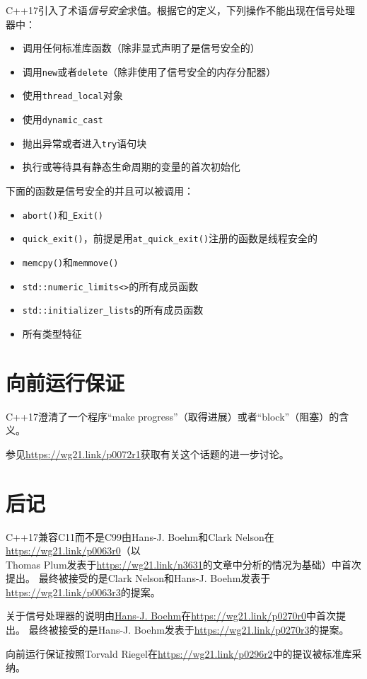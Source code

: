 C++17引入了术语\emph{信号安全}求值。根据它的定义，下列操作不能出现在信号处理器中：
\begin{itemize}
    \item 调用任何标准库函数（除非显式声明了是信号安全的）
    \item 调用\texttt{new}或者\texttt{delete}（除非使用了信号安全的内存分配器）
    \item 使用\texttt{thread\_local}对象
    \item 使用\texttt{dynamic\_cast}
    \item 抛出异常或者进入\texttt{try}语句块
    \item 执行或等待具有静态生命周期的变量的首次初始化
\end{itemize}
下面的函数是信号安全的并且可以被调用：
\begin{itemize}
    \item \texttt{abort()}和\texttt{\_Exit()}
    \item \texttt{quick\_exit()}，前提是用\texttt{at\_quick\_exit()}注册的函数是线程安全的
    \item \texttt{memcpy()}和\texttt{memmove()}
    \item \texttt{std::numeric\_limits<>}的所有成员函数
    \item \texttt{std::initializer\_lists}的所有成员函数
    \item 所有类型特征
\end{itemize}


\section{向前运行保证}
C++17澄清了一个程序“make progress”（取得进展）或者“block”（阻塞）的含义。

参见\url{https://wg21.link/p0072r1}获取有关这个话题的进一步讨论。


\section{后记}
C++17兼容C11而不是C99由Hans-J. Boehm和Clark Nelson在\url{https://wg21.link/p0063r0}（以\\
Thomas Plum发表于\url{https://wg21.link/n3631}的文章中分析的情况为基础）中首次提出。
最终被接受的是Clark Nelson和Hans-J. Boehm发表于\url{https://wg21.link/p0063r3}的提案。

关于信号处理器的说明由\url{Hans-J. Boehm}在\url{https://wg21.link/p0270r0}中首次提出。
最终被接受的是Hans-J. Boehm发表于\url{https://wg21.link/p0270r3}的提案。

向前运行保证按照Torvald Riegel在\url{https://wg21.link/p0296r2}中的提议被标准库采纳。
